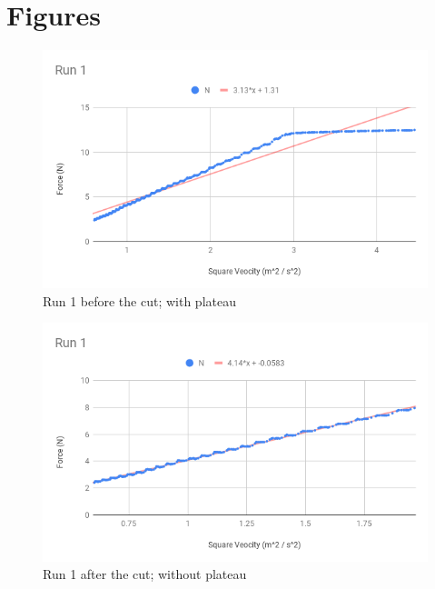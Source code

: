 \section{Figures}
%
\begin{figure}[ht]
    \centering
    \includegraphics[scale=0.71]{image/10-centripetal/Run1BeforeCut.png}
    \caption{Run 1 before the cut; with plateau}
    \label{figure.10.run.1.before}
\end{figure}
%
\begin{figure}[ht]
    \centering
    \includegraphics[scale=0.71]{image/10-centripetal/Run1.png}
    \caption{Run 1 after the cut; without plateau}
    \label{figure.10.run.1}
\end{figure}
%